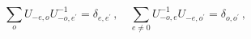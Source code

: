 \begin{equation}
\sum_{o}U_{-e,o}U_{-o,e^{\prime }}^{-1}=\delta _{e,e^{\prime }}\,,\quad
\sum_{e\neq 0}U_{-o,e}^{-1}U_{-e,o^{\prime }}=\delta _{o,o^{\prime }}\,,
\label{eq_UUinv}
\end{equation}

